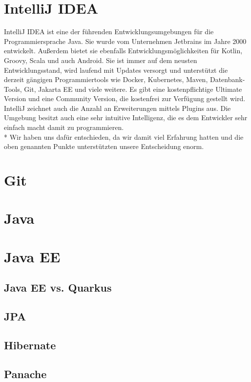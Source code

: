 \section{IntelliJ IDEA}

IntelliJ IDEA ist eine der führenden Entwicklungsumgebungen für die Programmiersprache Java. Sie wurde vom Unternehmen Jetbrains im Jahre 2000 entwickelt.
Außerdem bietet sie ebenfalls Entwicklungsmöglichkeiten für Kotlin, Groovy, Scala und auch Android.
Sie ist immer auf dem neusten Entwicklungsstand, wird laufend mit Updates versorgt und unterstützt die derzeit gängigen Programmiertools
wie Docker, Kubernetes, Maven, Datenbank-Tools, Git, Jakarta EE und viele weitere.
Es gibt eine kostenpflichtige Ultimate Version und eine Community Version, die kostenfrei zur Verfügung gestellt wird.
IntelliJ zeichnet auch die Anzahl an Erweiterungen mittels Plugins aus. Die Umgebung besitzt auch eine
sehr intuitive Intelligenz, die es dem Entwickler sehr einfach macht damit zu programmieren.
\cite{IntJ} \\*
Wir haben uns dafür entschieden, da wir damit viel Erfahrung hatten und die oben genannten Punkte
unterstützten unsere Entscheidung enorm.

\section{Git}
\cite{GitKinsta}


\section{Java}

\section{Java EE}

\subsection{Java EE vs. Quarkus}

\subsection{JPA}

\subsection{Hibernate}

\subsection{Panache}

